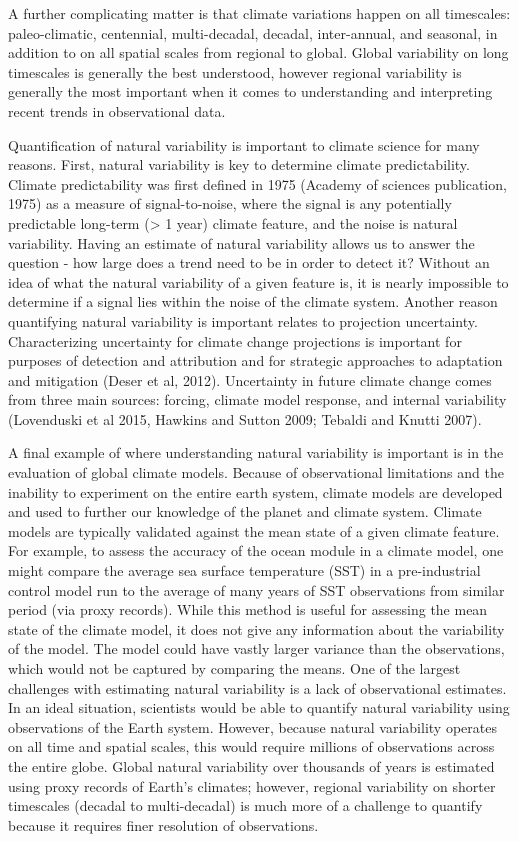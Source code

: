 A further complicating matter is that climate variations happen on all timescales: paleo-climatic, centennial, multi-decadal, decadal, inter-annual, and seasonal, in addition to on all spatial scales from regional to global. Global variability on long timescales is generally the best understood, however regional variability is generally the most important when it comes to understanding and interpreting recent trends in observational data.

Quantification of natural variability is important to climate science for many reasons. First, natural variability is key to determine climate predictability. Climate predictability was first defined in 1975 (Academy of sciences publication, 1975) as a measure of signal-to-noise, where the signal is any potentially predictable long-term (> 1 year) climate feature, and the noise is natural variability. Having an estimate of natural variability allows us to answer the question - how large does a trend need to be in order to detect it? Without an idea of what the natural variability of a given feature is, it is nearly impossible to determine if a signal lies within the noise of the climate system.
Another reason quantifying natural variability is important relates to projection uncertainty. Characterizing uncertainty for climate change projections is important for purposes of detection and attribution and for strategic approaches to adaptation and mitigation (Deser et al, 2012). Uncertainty in future climate change comes from three main sources: forcing, climate model response, and internal variability (Lovenduski et al 2015, Hawkins and Sutton 2009; Tebaldi and Knutti 2007).

A final example of where understanding natural variability is important is in the evaluation of global climate models. Because of observational limitations and the inability to experiment on the entire earth system, climate models are developed and used to further our knowledge of the planet and climate system. Climate models are typically validated against the mean state of a given climate feature. For example, to assess the accuracy of the ocean module in a climate model, one might compare the average sea surface temperature (SST) in a pre-industrial control model run to the average of many years of SST observations from similar period (via proxy records). While this method is useful for assessing the mean state of the climate model, it does not give any information about the variability of the model. The model could have vastly larger variance than the observations, which would not be captured by comparing the means.
One of the largest challenges with estimating natural variability is a lack of observational estimates. In an ideal situation, scientists would be able to quantify natural variability using observations of the Earth system. However, because natural variability operates on all time and spatial scales, this would require millions of observations across the entire globe. Global natural variability over thousands of years is estimated using proxy records of Earth's climates; however, regional variability on shorter timescales (decadal to multi-decadal) is much more of a challenge to quantify because it requires finer resolution of observations.

